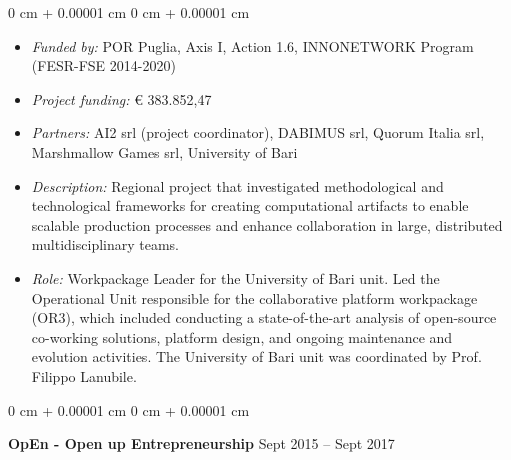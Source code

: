 \documentclass[10pt, a4paper]{article}
\newenvironment{highlights}{
    \begin{itemize}[
        topsep=0.10 cm,
        parsep=0.10 cm,
        partopsep=0pt,
        itemsep=0pt,
        leftmargin=0 cm + 10pt
    ]
}{
    \end{itemize}
} %
\newenvironment{onecolentry}{
    \begin{adjustwidth}{
        0 cm + 0.00001 cm
    }{
        0 cm + 0.00001 cm
    }
}{
    \end{adjustwidth}
} %
\newenvironment{twocolentry}[2][]{
    \onecolentry
    \def\secondColumn{#2}
    \setcolumnwidth{\fill, 4.5 cm}
    \begin{paracol}{2}
}{
    \switchcolumn \raggedleft \secondColumn
    \end{paracol}
    \endonecolentry
} %
\begin{document}
        \vspace{0.10 cm}
        \begin{onecolentry}
            \begin{highlights}
                \item \textit{Funded by:} POR Puglia, Axis I, Action 1.6, INNONETWORK Program (FESR-FSE 2014-2020)
                \item \textit{Project funding:} € 383.852,47
                \item \textit{Partners:} AI2 srl (project coordinator), DABIMUS srl, Quorum Italia srl, Marshmallow Games srl, University of Bari
                \item \textit{Description:} Regional project that investigated methodological and technological frameworks for creating computational artifacts to enable scalable production processes and enhance collaboration in large, distributed multidisciplinary teams.
                \item \textit{Role:} Workpackage Leader for the University of Bari unit. Led the Operational Unit responsible for the collaborative platform workpackage (OR3), which included conducting a state-of-the-art analysis of open-source co-working solutions, platform design, and ongoing maintenance and evolution activities. The University of Bari unit was coordinated by Prof. Filippo Lanubile.
            \end{highlights}
        \end{onecolentry}


        \vspace{0.2 cm}

        \begin{twocolentry}{
            Sept 2015 – Sept 2017
        }
            \textbf{OpEn - Open up Entrepreneurship}\end{twocolentry}
\end{document}
